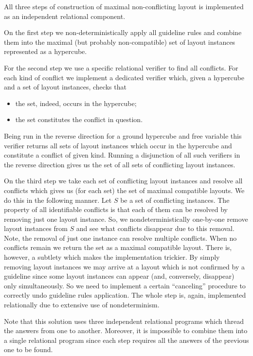All three steps of construction of maximal non-conflicting layout is implemented as an independent relational component.

On the first step we non-deterministically apply all guideline rules and combine them into the maximal
(but probably non-compatible) set of layout instances represented as a hypercube.

For the second step we use a specific relational verifier to find all conflicts.
For each kind of conflict we implement
a dedicated verifier which, given a hypercube and a set of layout instances, checks that

\begin{itemize}
\item the set, indeed, occurs in the hypercube;
\item the set constitutes the conflict in question.
\end{itemize}

\noindent Being run in the reverse direction for a ground hypercube and free variable this verifier returns all
sets of layout instances which occur in the hypercube and constitute a conflict of given kind.
Running a disjunction of all such verifiers in the reverse direction gives us the set of all sets of conflicting layout instances.

On the third step we take each set of conflicting layout instances and resolve all conflicts which gives us (for each set) the set of maximal compatible layouts.
We do this in the following manner.
Let $S$ be a set of conflicting instances.
The property of all identifiable conflicts is that each of them can be resolved by removing just one layout instance.
So, we nondeterministically one-by-one remove layout instances from $S$ and see what conflicts disappear due to this removal.
Note, the removal of just one instance can resolve multiple conflicts. When no conflicts remain we return the set as a maximal compatible layout.
There is, however, a subtlety which makes the implementation trickier.
By simply removing layout instances we may arrive at a layout which is not confirmed by a guideline since some layout instances can appear (and,
conversely, disappear) only simultaneously.
So we need to implement a certain ``canceling'' procedure to correctly
undo guideline rules application.
The whole step is, again, implemented relationally due to extensive use of
nondeterminism.

Note that this solution uses three independent relational programs which thread the answers from one to another.
Moreover, it is impossible to combine them into a single relational program since each step requires all the answers
of the previous one to be found.

